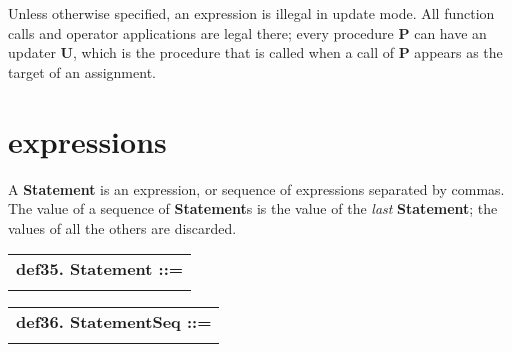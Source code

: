 \documentclass{report}
\begin{document}
Unless otherwise specified, an expression is illegal in update mode.
All function calls and operator applications are legal there; every
procedure {\bf P} can have an updater {\bf U}, which is the procedure that is
called when a call of {\bf P} appears as the target of an assignment.

\section{expressions}


A {\bf Statement} is an expression, or sequence of expressions separated
by commas. The value of a sequence of {\bf Statement}s is the value of the
{\em last} {\bf Statement}; the values of all the others are discarded.

\begin{tabular}{l}
{\bf def35. Statement ::= }\\ 
\hspace*{3mm}{\tt Expr++ "," SEMI} \\ 
\end{tabular}



\begin{tabular}{l}
{\bf def36. StatementSeq ::= }\\ 
\hspace*{3mm}{\tt Statement*} \\ 
\end{tabular}
\end{document}
